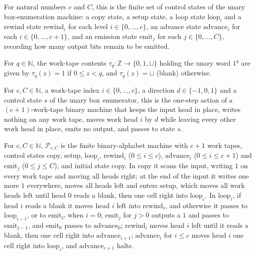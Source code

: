 \begin{definition}
\label{Complexity.PolyControl}
\leanok
For natural numbers $c$ and $C$, this is the finite set of control states of the unary box-enumeration machine: a copy state, a setup state, a loop state $\mathrm{loop}_i$ and a rewind state $\mathrm{rewind}_i$ for each level $i \in \{0,\dots,c\}$, an advance state $\mathrm{advance}_i$ for each $i \in \{0,\dots,c+1\}$, and an emission state $\mathrm{emit}_j$ for each $j \in \{0,\dots,C\}$, recording how many output bits remain to be emitted.
\end{definition}

\begin{definition}
\label{Complexity.polyTape}
\leanok
For $q \in \mathbb{N}$, the work-tape contents $\tau_q \colon \mathbb{Z} \to \{0,1,\sqcup\}$ holding the unary word $1^q$ are given by $\tau_q(z) = 1$ if $0 \le z < q$, and $\tau_q(z) = \sqcup$ (blank) otherwise.
\end{definition}

\begin{definition}
\label{Complexity.polyMove}
\leanok
{}
For $c, C \in \mathbb{N}$, a work-tape index $i \in \{0,\dots,c\}$, a direction $d \in \{-1,0,1\}$ and a control state $s$ of the unary box enumerator, this is the one-step action of a $(c+1)$-work-tape binary machine that keeps the input head in place, writes nothing on any work tape, moves work head $i$ by $d$ while leaving every other work head in place, emits no output, and passes to state $s$.
\end{definition}

\begin{definition}
\label{Complexity.polyUnaryTM}
\leanok
{}
For $c, C \in \mathbb{N}$, $\mathcal{P}_{c,C}$ is the finite binary-alphabet machine with $c+1$ work tapes, control states copy, setup, $\mathrm{loop}_i$, $\mathrm{rewind}_i$ ($0 \le i \le c$), $\mathrm{advance}_i$ ($0 \le i \le c+1$) and $\mathrm{emit}_j$ ($0 \le j \le C$), and initial state copy. In copy it scans the input, writing $1$ on every work tape and moving all heads right; at the end of the input it writes one more $1$ everywhere, moves all heads left and enters setup, which moves all work heads left until head $0$ reads a blank, then one cell right into $\mathrm{loop}_c$. In $\mathrm{loop}_i$, if head $i$ reads a blank it moves head $i$ left into $\mathrm{rewind}_i$, and otherwise it passes to $\mathrm{loop}_{i-1}$, or to $\mathrm{emit}_C$ when $i = 0$; $\mathrm{emit}_j$ for $j > 0$ outputs a $1$ and passes to $\mathrm{emit}_{j-1}$, and $\mathrm{emit}_0$ passes to $\mathrm{advance}_0$; $\mathrm{rewind}_i$ moves head $i$ left until it reads a blank, then one cell right into $\mathrm{advance}_{i+1}$; $\mathrm{advance}_i$ for $i \le c$ moves head $i$ one cell right into $\mathrm{loop}_i$, and $\mathrm{advance}_{c+1}$ halts.
\end{definition}

